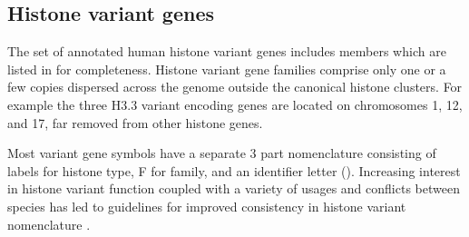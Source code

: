   \subsection{Histone variant genes}
    The set of annotated human histone variant genes
    includes \TotalCoreVariantGenes{} members
    which are listed in  for completeness.
    Histone variant gene families comprise only one or a few copies
    dispersed across the genome outside the canonical histone clusters.
    For example the three H3.3 variant encoding genes are located
    on chromosomes 1, 12, and 17, far removed from other histone genes.

    Most variant gene symbols have a separate 3 part nomenclature
    consisting of labels for histone type, F for family,
    and an identifier letter ().
    Increasing interest in histone variant function \citep{MazeAllis2014}
    coupled with a variety of usages and conflicts between species
    has led to guidelines for improved consistency in histone variant nomenclature
    \citep{Talbert2012}.
